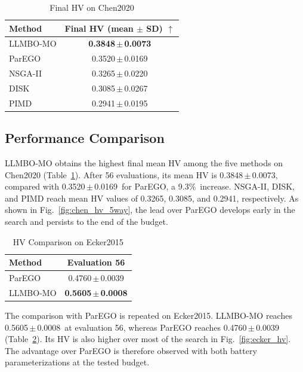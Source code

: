 \documentclass[journal,10pt]{IEEEtran}
\newcommand{\ChenLLMBOMean}{0.3848}
\newcommand{\ChenLLMBOStd}{0.0073}
\newcommand{\ChenParEGOMean}{0.3520}
\newcommand{\ChenParEGOStd}{0.0169}
\newcommand{\ChenFinalGain}{9.3\%}
\newcommand{\ChenNSGAMean}{0.3265}
\newcommand{\ChenNSGAStd}{0.0220}
\newcommand{\ChenDISKMean}{0.3085}
\newcommand{\ChenDISKStd}{0.0267}
\newcommand{\ChenPIMDMean}{0.2941}
\newcommand{\ChenPIMDStd}{0.0195}
\newcommand{\EckerParEGOMean}{0.4760}
\newcommand{\EckerParEGOStd}{0.0039}
\newcommand{\EckerLLMBOMean}{0.5605}
\newcommand{\EckerLLMBOStd}{0.0008}
\begin{document}
\begin{table}[!t]
\caption{Final HV on Chen2020}
\label{tab:chen_results}
\centering
\footnotesize
\setlength{\tabcolsep}{4.0pt}
\begin{tabular}{@{}lc@{}}
\toprule
Method & Final HV (mean $\pm$ SD) $\uparrow$ \\
\midrule
LLMBO-MO & \textbf{\ChenLLMBOMean\,$\pm$\,\ChenLLMBOStd} \\
ParEGO & \ChenParEGOMean\,$\pm$\,\ChenParEGOStd \\
NSGA-II & \ChenNSGAMean\,$\pm$\,\ChenNSGAStd \\
DISK & \ChenDISKMean\,$\pm$\,\ChenDISKStd \\
PIMD & \ChenPIMDMean\,$\pm$\,\ChenPIMDStd \\
\bottomrule
\end{tabular}
\end{table}

\subsection{Performance Comparison}

LLMBO-MO obtains the highest final mean HV among the five methods on Chen2020
(Table~\ref{tab:chen_results}). After 56 evaluations, its mean HV is
\ChenLLMBOMean\,$\pm$\,\ChenLLMBOStd, compared with
\ChenParEGOMean\,$\pm$\,\ChenParEGOStd\ for ParEGO, a
\ChenFinalGain\ increase. NSGA-II, DISK, and PIMD reach mean HV values of
\ChenNSGAMean, \ChenDISKMean, and \ChenPIMDMean, respectively.
As shown in Fig.~\ref{fig:chen_hv_5way}, the lead over ParEGO develops early
in the search and persists to the end of the budget.

\begin{table}[!t]
\caption{HV Comparison on Ecker2015}
\label{tab:ecker_results}
\centering
\footnotesize
\setlength{\tabcolsep}{4.0pt}
\begin{tabular}{@{}lc@{}}
\toprule
Method & Evaluation 56 \\
\midrule
ParEGO & \EckerParEGOMean\,$\pm$\,\EckerParEGOStd \\
LLMBO-MO & \textbf{\EckerLLMBOMean\,$\pm$\,\EckerLLMBOStd} \\
\bottomrule
\end{tabular}
\end{table}

The comparison with ParEGO is repeated on Ecker2015. LLMBO-MO reaches
\EckerLLMBOMean\,$\pm$\,\EckerLLMBOStd\ at evaluation 56, whereas ParEGO
reaches \EckerParEGOMean\,$\pm$\,\EckerParEGOStd
(Table~\ref{tab:ecker_results}). Its HV is also higher over most of the search
in Fig.~\ref{fig:ecker_hv}. The advantage over ParEGO is therefore observed
with both battery parameterizations at the tested budget.
\end{document}
